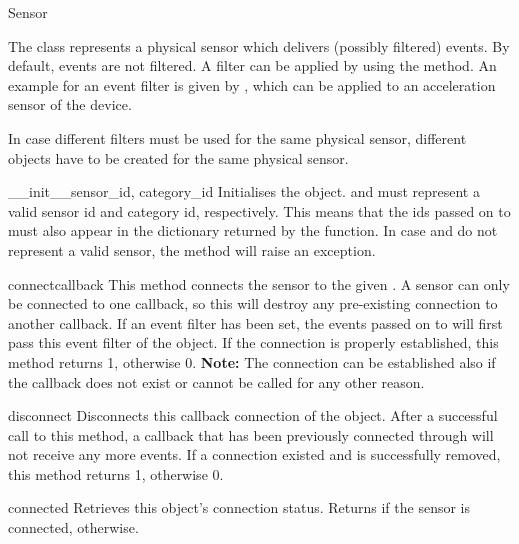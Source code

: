 \begin{classdesc*}{Sensor}

The  class represents a physical sensor which delivers (possibly filtered) events.
By default, events are not filtered. A filter can be applied by using the 
method. An example for an event filter is given by , which can
be applied to an acceleration sensor of the device.

In case different filters must be used for the same physical sensor, different 
objects have to be created for the same physical sensor.

\begin{methoddesc}[Sensor]{__init__}{sensor_id, category_id}
Initialises the  object.  and 
must represent a valid sensor id and category id, respectively. This means that
the ids passed on to  must also appear in the dictionary returned by
the  function.
In case  and  do not represent a valid sensor,
the  method will raise an exception.
\end{methoddesc}

\begin{methoddesc}[Sensor]{connect}{callback}
This method connects the sensor to the given . A sensor can only be connected
to one callback, so this will destroy any pre-existing connection to another callback.
If an event filter has been set, the events passed on to  will first pass
this event filter of the  object.
If the connection is properly established, this method returns 1, otherwise 0.
{\bf Note:} The connection can be established also if the callback does not exist or cannot be
called for any other reason.
\end{methoddesc}

\begin{methoddesc}[Sensor]{disconnect}{}
Disconnects this callback connection of the  object. After a successful call
to this method, a callback that has been previously connected through  will
not receive any more events.
If a connection existed and is successfully removed, this method returns 1, otherwise 0.
\end{methoddesc}

\begin{methoddesc}[Sensor]{connected}{}
Retrieves this  object's connection status.
Returns  if the sensor is connected,  otherwise.
\end{methoddesc}


\end{classdesc*}
